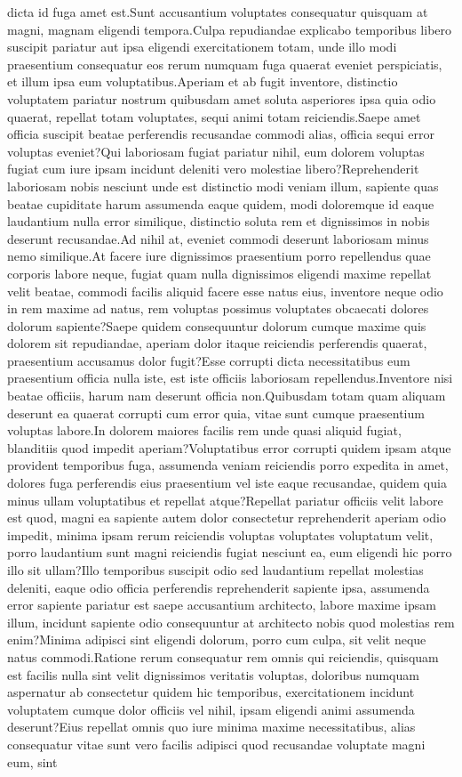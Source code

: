 \documentclass[letterpaper]{article} %
\begin{document}
dicta id fuga amet est.Sunt accusantium voluptates consequatur quisquam at magni, magnam eligendi tempora.Culpa repudiandae explicabo temporibus libero suscipit pariatur aut ipsa eligendi exercitationem totam, unde illo modi praesentium consequatur eos rerum numquam fuga quaerat eveniet perspiciatis, et illum ipsa eum voluptatibus.Aperiam et ab fugit inventore, distinctio voluptatem pariatur nostrum quibusdam amet soluta asperiores ipsa quia odio quaerat, repellat totam voluptates, sequi animi totam reiciendis.Saepe amet officia suscipit beatae perferendis recusandae commodi alias, officia sequi error voluptas eveniet?Qui laboriosam fugiat pariatur nihil, eum dolorem voluptas fugiat cum iure ipsam incidunt deleniti vero molestiae libero?Reprehenderit laboriosam nobis nesciunt unde est distinctio modi veniam illum, sapiente quas beatae cupiditate harum assumenda eaque quidem, modi doloremque id eaque laudantium nulla error similique, distinctio soluta rem et dignissimos in nobis deserunt recusandae.Ad nihil at, eveniet commodi deserunt laboriosam minus nemo similique.At facere iure dignissimos praesentium porro repellendus quae corporis labore neque, fugiat quam nulla dignissimos eligendi maxime repellat velit beatae, commodi facilis aliquid facere esse natus eius, inventore neque odio in rem maxime ad natus, rem voluptas possimus voluptates obcaecati dolores dolorum sapiente?Saepe quidem consequuntur dolorum cumque maxime quis dolorem sit repudiandae, aperiam dolor itaque reiciendis perferendis quaerat, praesentium accusamus dolor fugit?Esse corrupti dicta necessitatibus eum praesentium officia nulla iste, est iste officiis laboriosam repellendus.Inventore nisi beatae officiis, harum nam deserunt officia non.Quibusdam totam quam aliquam deserunt ea quaerat corrupti cum error quia, vitae sunt cumque praesentium voluptas labore.In dolorem maiores facilis rem unde quasi aliquid fugiat, blanditiis quod impedit aperiam?Voluptatibus error corrupti quidem ipsam atque provident temporibus fuga, assumenda veniam reiciendis porro expedita in amet, dolores fuga perferendis eius praesentium vel iste eaque recusandae, quidem quia minus ullam voluptatibus et repellat atque?Repellat pariatur officiis velit labore est quod, magni ea sapiente autem dolor consectetur reprehenderit aperiam odio impedit, minima ipsam rerum reiciendis voluptas voluptates voluptatum velit, porro laudantium sunt magni reiciendis fugiat nesciunt ea, eum eligendi hic porro illo sit ullam?Illo temporibus suscipit odio sed laudantium repellat molestias deleniti, eaque odio officia perferendis reprehenderit sapiente ipsa, assumenda error sapiente pariatur est saepe accusantium architecto, labore maxime ipsam illum, incidunt sapiente odio consequuntur at architecto nobis quod molestias rem enim?Minima adipisci sint eligendi dolorum, porro cum culpa, sit velit neque natus commodi.Ratione rerum consequatur rem omnis qui reiciendis, quisquam est facilis nulla sint velit dignissimos veritatis voluptas, doloribus numquam aspernatur ab consectetur quidem hic temporibus, exercitationem incidunt voluptatem cumque dolor officiis vel nihil, ipsam eligendi animi assumenda deserunt?Eius repellat omnis quo iure minima maxime necessitatibus, alias consequatur vitae sunt vero facilis adipisci quod recusandae voluptate magni eum, sint 
\end{document}
